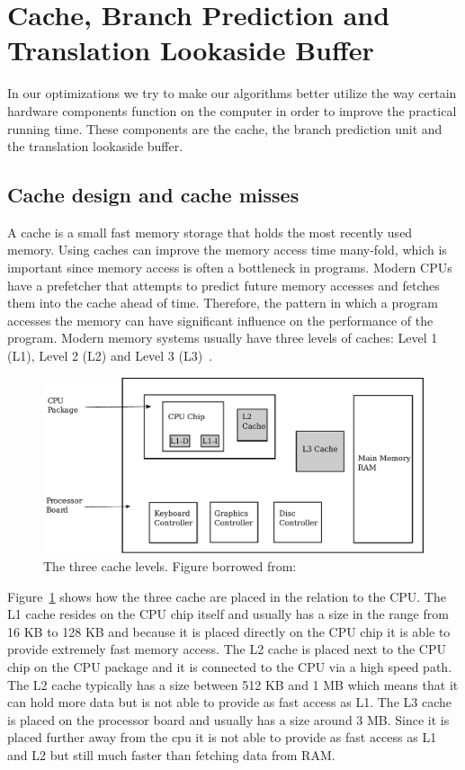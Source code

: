 \section{Cache, Branch Prediction and Translation Lookaside Buffer}
In our optimizations we try to make our algorithms better utilize the way certain hardware components function on the computer in order to improve the practical running time. 
These components are the cache, the branch prediction unit and the translation lookaside buffer.

\subsection{Cache design and cache misses}
\label{sec:cachedesignandcachemiss}
A cache is a small fast memory storage that holds the most recently used memory.
Using caches can improve the memory access time many-fold, which is important since memory access is often a bottleneck in programs.
Modern CPUs have a prefetcher that attempts to predict future memory accesses and fetches them into the cache ahead of time.
Therefore, the pattern in which a program accesses the memory can have significant influence on the performance of the program.
Modern memory systems usually have three levels of caches: Level 1 (L1), Level 2 (L2) and Level 3 (L3)~.

\begin{figure}
\includegraphics[width=\textwidth]{CacheLevels.pdf}
\caption{The three cache levels. Figure borrowed from:~\citep[Section~4.5.1]{Tanenbaum}}
\label{fig:CacheLevels}
\end{figure}

Figure~\ref{fig:CacheLevels} shows how the three cache are placed in the relation to the CPU. 
The L1 cache resides on the CPU chip itself and usually has a size in the range from 16 KB to 128 KB and because it is placed directly on the CPU chip it is able to provide extremely fast memory access.
The L2 cache is placed next to the CPU chip on the CPU package and it is connected to the CPU via a high speed path. The L2 cache typically has a size between 512 KB and 1 MB which means that it can hold more data but is not able to provide as fast access as L1.
The L3 cache is placed on the processor board and usually has a size around 3 MB. 
Since it is placed further away from the cpu it is not able to provide as fast access as L1 and L2 but still much faster than fetching data from RAM.

